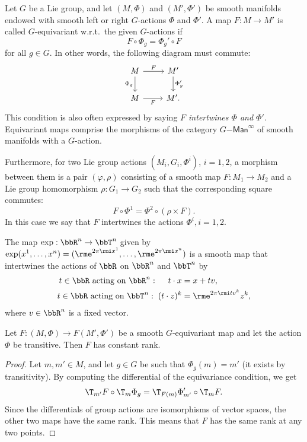 \begin{defn}
    Let $G$ be a Lie group, and let $(M,\Phi)$ and $(M',\Phi')$ be smooth manifolds endowed with smooth left or right $G$-actions $\Phi$ and $\Phi'$. A map $F:M\to M'$ is called $G$-equivariant w.r.t.\ the given $G$-actions if
    \[F\circ \Phi_g=\Phi_g' \circ F\]
    for all $g\in G$.
    In other words, the following diagram must commute:
    \[
    \begin{tikzcd}[every matrix/.append style={name=m}]
       M \arrow[r,"F"]\arrow[d,"\Phi_g",swap] & M'\arrow[d,"\Phi_g'"]\\
       M \arrow[r,"F", swap] & M'.
    \end{tikzcd}
    \]
    This condition is also often expressed by saying \emph{$F$ intertwines $\Phi$ and $\Phi'$}. Equivariant maps comprise the morphisms of the category $G\mathsf{-Man}^\infty$ of smooth manifolds with a $G$-action.

    Furthermore, for two Lie group actions $(M_i,G_i,\Phi^i)$, $i=1,2$, a morphism between them is a pair $(\varphi,\rho)$ consisting of a smooth map $F:M_1\to M_2$ and a Lie group homomorphism $\rho:G_1\to G_2$ such that the corresponding square commutes:
    \[F\circ \Phi^1=\Phi^2\circ \left(\rho\times F \right).\]
    In this case we say that $F$ intertwines the actions $\Phi^i,i=1,2$.
\end{defn}

\begin{example}
    The map $\exp:\bbR^n\to \bbT^n$ given by $\exp(x^1,\ldots,x^n)=(\rme^{2\pi\rmi x^1},\ldots,\rme^{2\pi\rmi x^n})$ is a smooth map that intertwines the actions of $\bbR$ on $\bbR^n$ and $\bbT^n$ by
    \begin{align}
        t\in\bbR\text{ acting on }\bbR^n:\;\quad t\cdot x&=x+tv,\\
        t\in\bbR\text{ acting on }\bbT^n:\; (t\cdot z)^k&=\rme^{2\pi\rmi tv^k}z^k,
    \end{align}
    where $v\in\bbR^n$ is a fixed vector.
\end{example}

\begin{thm}\label{thm equivariant rank}
    Let $F:(M,\Phi)\to F(M',\Phi')$ be a smooth $G$-equivariant map and let the action $\Phi$ be transitive. Then $F$ has constant rank.
\end{thm}
\begin{proof}
    Let $m,m'\in M$, and let $g\in G$ be such that $\Phi_g(m)=m'$ (it exists by transitivity). By computing the differential of the equivariance condition, we get
    \[\T_{m'}F\circ \T_m\Phi_g=\T_{F(m)}\Phi_{m'}'\circ \T_mF.\]
    Since the differentials of group actions are isomorphisms of vector spaces, the other two maps have the same rank. This means that $F$ has the same rank at any two points.
\end{proof}


